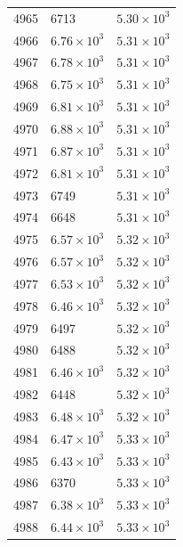 \begin{table}[H]
\begin{tabular}{lll}
4965 & 6713 & $\displaystyle 5.30 \times 10^{3}$ \\
4966 & $\displaystyle 6.76 \times 10^{3}$ & $\displaystyle 5.31 \times 10^{3}$ \\
4967 & $\displaystyle 6.78 \times 10^{3}$ & $\displaystyle 5.31 \times 10^{3}$ \\
4968 & $\displaystyle 6.75 \times 10^{3}$ & $\displaystyle 5.31 \times 10^{3}$ \\
4969 & $\displaystyle 6.81 \times 10^{3}$ & $\displaystyle 5.31 \times 10^{3}$ \\
4970 & $\displaystyle 6.88 \times 10^{3}$ & $\displaystyle 5.31 \times 10^{3}$ \\
4971 & $\displaystyle 6.87 \times 10^{3}$ & $\displaystyle 5.31 \times 10^{3}$ \\
4972 & $\displaystyle 6.81 \times 10^{3}$ & $\displaystyle 5.31 \times 10^{3}$ \\
4973 & 6749 & $\displaystyle 5.31 \times 10^{3}$ \\
4974 & 6648 & $\displaystyle 5.31 \times 10^{3}$ \\
4975 & $\displaystyle 6.57 \times 10^{3}$ & $\displaystyle 5.32 \times 10^{3}$ \\
4976 & $\displaystyle 6.57 \times 10^{3}$ & $\displaystyle 5.32 \times 10^{3}$ \\
4977 & $\displaystyle 6.53 \times 10^{3}$ & $\displaystyle 5.32 \times 10^{3}$ \\
4978 & $\displaystyle 6.46 \times 10^{3}$ & $\displaystyle 5.32 \times 10^{3}$ \\
4979 & 6497 & $\displaystyle 5.32 \times 10^{3}$ \\
4980 & 6488 & $\displaystyle 5.32 \times 10^{3}$ \\
4981 & $\displaystyle 6.46 \times 10^{3}$ & $\displaystyle 5.32 \times 10^{3}$ \\
4982 & 6448 & $\displaystyle 5.32 \times 10^{3}$ \\
4983 & $\displaystyle 6.48 \times 10^{3}$ & $\displaystyle 5.32 \times 10^{3}$ \\
4984 & $\displaystyle 6.47 \times 10^{3}$ & $\displaystyle 5.33 \times 10^{3}$ \\
4985 & $\displaystyle 6.43 \times 10^{3}$ & $\displaystyle 5.33 \times 10^{3}$ \\
4986 & 6370 & $\displaystyle 5.33 \times 10^{3}$ \\
4987 & $\displaystyle 6.38 \times 10^{3}$ & $\displaystyle 5.33 \times 10^{3}$ \\
4988 & $\displaystyle 6.44 \times 10^{3}$ & $\displaystyle 5.33 \times 10^{3}$ \\

\end{tabular}
\end{table}
